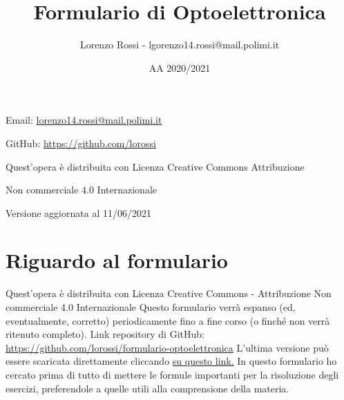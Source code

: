 \documentclass{article}
\title{Formulario di Optoelettronica}
\author{Lorenzo Rossi - lgorenzo14.rossi@mail.polimi.it}
\date{AA 2020/2021}
\begin{document}
\maketitle

\vspace{18em}

\large
\begin{doublespacing}\hypersetup{
    urlcolor=black,
  }
  \centerline{Email: \href{mailto://lorenzo14.rossi@mail.polimi.it}{lorenzo14.rossi@mail.polimi.it}}
  \centerline{GitHub: \url{https://github.com/lorossi}}

  \vspace{18em}
  \centerline{Quest'opera è distribuita con Licenza Creative Commons Attribuzione}
  \centerline{Non commerciale 4.0 Internazionale \ccbynceu}
  \centerline{Versione aggiornata al 11/06/2021}
\end{doublespacing}
\newpage


\tableofcontents
\clearpage
{}
\newpage

\section{Riguardo al formulario}
Quest'opera è distribuita con Licenza Creative Commons - Attribuzione Non commerciale 4.0 Internazionale \ccbynceu \newline
Questo formulario verrà espanso (ed, eventualmente, corretto) periodicamente fino a fine corso (o finché non verrà ritenuto completo). \newline
Link repository di GitHub: \url{https://github.com/lorossi/formulario-optoelettronica} \newline
L'ultima versione può essere scaricata direttamente cliccando \href{https://github.com/lorossi/formulario-optoelettronica/raw/master/formulario-optoelettronica.pdf}{su questo link.} \newline
In questo formulario ho cercato prima di tutto di mettere le formule importanti per la risoluzione degli esercizi, preferendole a quelle utili alla comprensione della materia.
\end{document}

